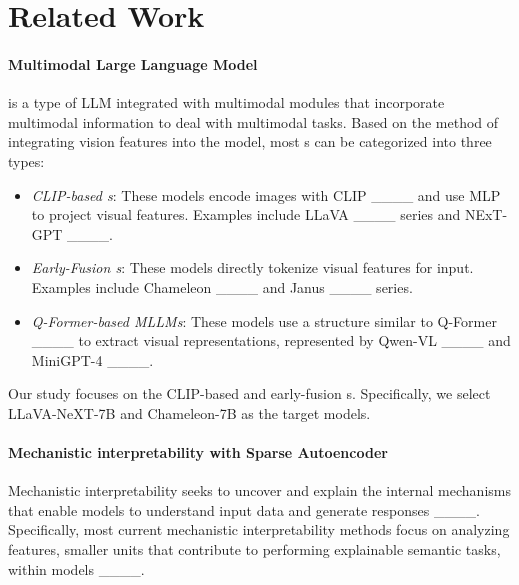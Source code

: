 \section{Related Work}
\label{sec:Related Work}

\paragraph{Multimodal Large Language Model}

\model{} is a type of LLM integrated with multimodal modules that incorporate multimodal information to deal with multimodal tasks. Based on the method of integrating vision features into the model, most \model{}s can be categorized into three types:

 
\begin{itemize}
    \item \textit{CLIP-based \model{}s}: These models encode images with CLIP ____ and use MLP to project visual features. Examples include LLaVA ____ series and NExT-GPT ____.
    \item \textit{Early-Fusion \model{}s}: These models directly tokenize visual features for input. Examples include Chameleon ____ and Janus ____ series.
    \item \textit{Q-Former-based MLLMs}: These models use a structure similar to Q-Former ____ to extract visual representations, represented by Qwen-VL ____ and MiniGPT-4 ____.
\end{itemize}

Our study focuses on the CLIP-based and early-fusion \model{}s. Specifically, we select LLaVA-NeXT-7B and Chameleon-7B as the target models.

\paragraph{Mechanistic interpretability with Sparse Autoencoder}

Mechanistic interpretability seeks to uncover and explain the internal mechanisms that enable models to understand input data and generate responses ____. Specifically, most current mechanistic interpretability methods focus on analyzing features, smaller units that contribute to performing explainable semantic tasks, within models ____.

